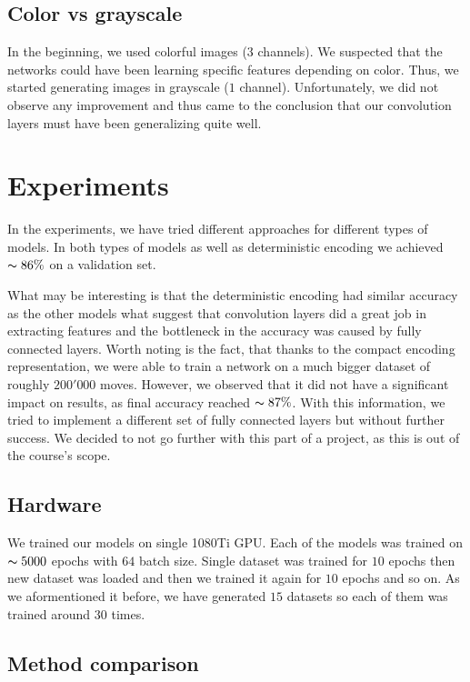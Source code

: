 \documentclass[10pt,twocolumn,letterpaper]{article}
\begin{document}
\subsection{Color vs grayscale}

In the beginning, we used colorful images ($3$ channels). We suspected that the
networks could have been learning specific features depending on color. Thus, we
started generating images in grayscale ($1$ channel). Unfortunately, we did not
observe any improvement and thus came to the conclusion that our convolution
layers must have been generalizing quite well.

\section{Experiments}

In the experiments, we have tried different approaches for different types of
models. In both types of models as well as deterministic encoding we achieved
$\thicksim 86\%$ on a validation set.

What may be interesting is that the deterministic encoding had similar accuracy
as the other models what suggest that convolution layers did a great job in
extracting features and the bottleneck in the accuracy was caused by fully
connected layers. Worth noting is the fact, that thanks to the compact encoding
representation, we were able to train a network on a much bigger dataset of
roughly $200'000$ moves. However, we observed that it did not have a significant
impact on results, as final accuracy reached $\thicksim 87\%$. With this
information, we tried to implement a different set of fully connected layers but
without further success. We decided to not go further with this part of a
project, as this is out of the course's scope.

\subsection{Hardware}

We trained our models on single 1080Ti GPU. Each of the models was trained on
$\thicksim 5000$ epochs with $64$ batch size. Single dataset was trained for
$10$ epochs then new dataset was loaded and then we trained it again for $10$
epochs and so on. As we aformentioned it before, we have generated $15$ datasets
so each of them was trained around $30$ times.

\subsection{Method comparison}
\end{document}
